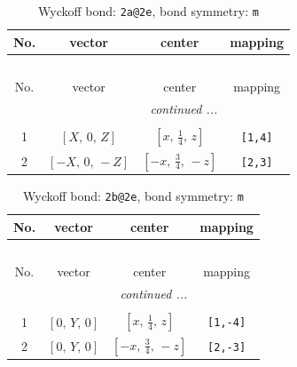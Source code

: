 \documentclass[fleqn,8pt]{jsarticle}
\begin{document}
\renewcommand{\arraystretch}{1.2}
\begin{longtable}{cccc}
\caption{Wyckoff bond: {\tt 2a@2e}, bond symmetry: {\tt m}}
 \\
 \hline \hline
No. & vector & center & mapping \\ \hline \endfirsthead

\multicolumn{3}{l}{\tablename\ \thetable{}} \\
 \hline \hline
No. & vector & center & mapping \\ \hline \endhead

 \hline \hline
\multicolumn{3}{r}{\footnotesize\it continued ...} \\ \endfoot

 \hline \hline
\multicolumn{3}{r}{} \\ \endlastfoot

1 & $\left[ X,\, 0,\, Z \right]$ & $\left[ x,\, \frac{1}{4},\, z \right]$ & {\tt [1,4]} \\ \hline
2 & $\left[ - X,\, 0,\, - Z \right]$ & $\left[ - x,\, \frac{3}{4},\, - z \right]$ & {\tt [2,3]} \\
\end{longtable}
\renewcommand{\arraystretch}{1.2}
\begin{longtable}{cccc}
\caption{Wyckoff bond: {\tt 2b@2e}, bond symmetry: {\tt m}}
 \\
 \hline \hline
No. & vector & center & mapping \\ \hline \endfirsthead

\multicolumn{3}{l}{\tablename\ \thetable{}} \\
 \hline \hline
No. & vector & center & mapping \\ \hline \endhead

 \hline \hline
\multicolumn{3}{r}{\footnotesize\it continued ...} \\ \endfoot

 \hline \hline
\multicolumn{3}{r}{} \\ \endlastfoot

1 & $\left[ 0,\, Y,\, 0 \right]$ & $\left[ x,\, \frac{1}{4},\, z \right]$ & {\tt [1,-4]} \\ \hline
2 & $\left[ 0,\, Y,\, 0 \right]$ & $\left[ - x,\, \frac{3}{4},\, - z \right]$ & {\tt [2,-3]} \\
\end{longtable}
\renewcommand{\arraystretch}{1.2}
\end{document}
